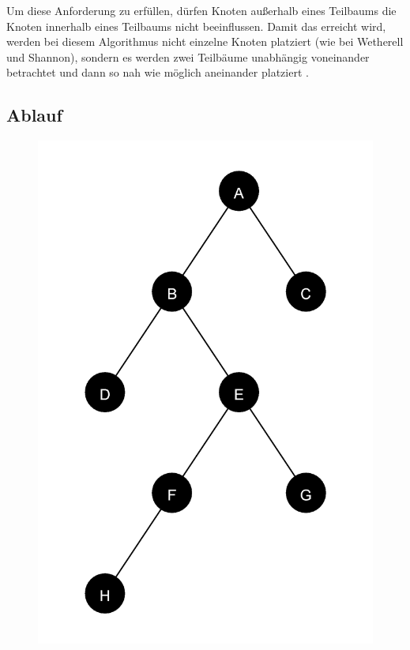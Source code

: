 Um diese Anforderung zu erfüllen, dürfen Knoten außerhalb eines Teilbaums die Knoten innerhalb eines Teilbaums nicht beeinflussen. 
Damit das erreicht wird, werden bei diesem Algorithmus nicht einzelne Knoten platziert (wie bei Wetherell und Shannon), 
sondern es werden zwei Teilbäume unabhängig voneinander betrachtet und dann so nah wie möglich aneinander platziert \cite[S. 225]{q2}. 

\label{chap:kapitel3_3_Ablauf}
\subsection{Ablauf}

\begin{figure}[ht]
    \centering
    \begin{minipage}[]{0.3\linewidth}
        \centering
        \includegraphics[scale=0.07]{abbildungen/tree_beispiel_LL_LR_RL_RR}

\end{minipage}
\end{figure}
